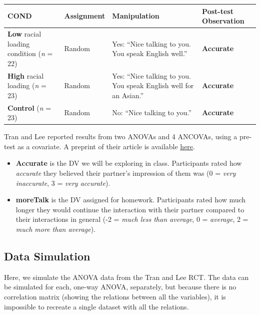 \documentclass[
  english,
]{book}
\providecommand{\tightlist}{%
  \setlength{\itemsep}{0pt}\setlength{\parskip}{0pt}}
\begin{document}
\begin{longtable}[]{@{}
  >{\raggedright\arraybackslash}p{}
  >{\raggedright\arraybackslash}p{}
  >{\raggedright\arraybackslash}p{}
  >{\raggedright\arraybackslash}p{}@{}}
\toprule
COND & Assignment & Manipulation & Post-test Observation \\
\midrule
\endhead
\textbf{Low} racial loading condition (\emph{n} = 22) & Random & Yes: ``Nice talking to you. You speak English well.'' & \textbf{Accurate} \\
\textbf{High} racial loading (\emph{n} = 23) & Random & Yes: ``Nice talking to you. You speak English well for an Asian.'' & \textbf{Accurate} \\
\textbf{Control} (\emph{n} = 23) & Random & No: ``Nice talking to you.'' & \textbf{Accurate} \\
\bottomrule
\end{longtable}

Tran and Lee \citeyearpar{tran_you_2014} reported results from two ANOVAs and 4 ANCOVAs, using a pre-test as a covariate. A preprint of their article is available \href{https://pdfs.semanticscholar.org/4146/b528961c041de317c6a4c699f12fc5a4bc22.pdf?_ga=2.179078439.2028716028.1610939782-1660125104.1610939782}{here}.

\begin{itemize}
\tightlist
\item
  \textbf{Accurate} is the DV we will be exploring in class. Participants rated how \emph{accurate} they believed their partner's impression of them was (0 = \emph{very inaccurate}, 3 = \emph{very accurate}).
\item
  \textbf{moreTalk} is the DV assigned for homework. Participants rated how much longer they would continue the interaction with their partner compared to their interactions in general (-2 = \emph{much less than average}, 0 = \emph{average}, 2 = \emph{much more than average}).
\end{itemize}

\hypertarget{data-simulation}{%
\subsection{Data Simulation}\label{data-simulation}}

Here, we simulate the ANOVA data from the Tran and Lee \citeyearpar{tran_you_2014} RCT. The data can be simulated for each, one-way ANOVA, separately, but because there is no correlation matrix (showing the relations between all the variables), it is impossible to recreate a single dataset with all the relations.
\end{document}
